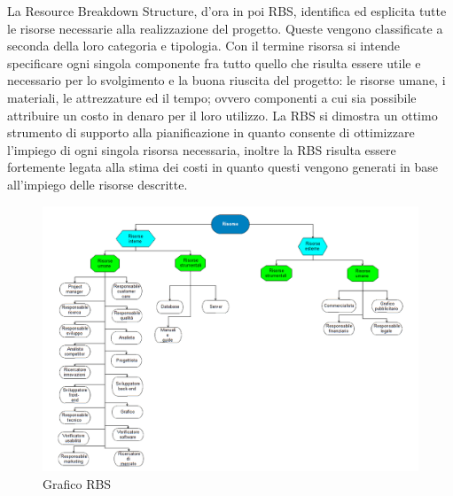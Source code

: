 La Resource Breakdown Structure, d'ora in poi RBS, identifica ed esplicita tutte le
risorse necessarie alla realizzazione del progetto. Queste vengono classificate a seconda della
loro categoria e tipologia. Con il termine risorsa si intende specificare ogni singola
componente fra tutto quello che risulta essere utile e necessario per lo svolgimento e la
buona riuscita del progetto: le risorse umane, i materiali, le attrezzature ed il tempo;
ovvero componenti a cui sia possibile attribuire un costo in denaro per il loro utilizzo. La
RBS si dimostra un ottimo strumento di supporto alla pianificazione in quanto consente
di ottimizzare l'impiego di ogni singola risorsa necessaria, inoltre la RBS risulta essere fortemente
legata alla stima dei costi in quanto questi vengono generati in base all'impiego delle
risorse descritte.

\begin{figure}[H]
\centering %
\includegraphics[scale=0.4]{img/Risorse_rbs.png}
\caption{Grafico RBS}
\label{fig:Grafico RBS}
\end{figure}
